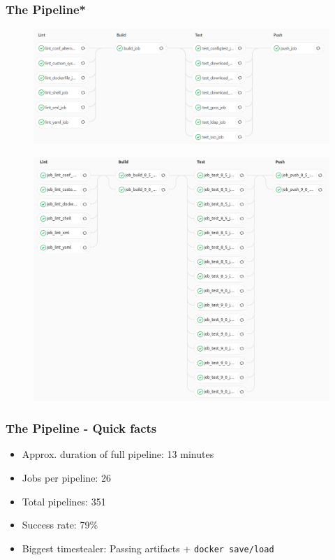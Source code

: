 \documentclass[14pt,aspectratio=169]{beamer}
\begin{document}
\begin{frame}
  \frametitle{The Pipeline*}
  \begin{figure}
    \includegraphics[width=\textwidth]{images/pipeline_2.png}
  \end{figure}
\end{frame}

\begin{frame}
  \begin{figure}
    \includegraphics[height=0.9\textheight]{images/pipeline_multi.png}
  \end{figure}
\end{frame}

\begin{frame}
  \frametitle{The Pipeline - Quick facts}
  \begin{itemize}
    \item Approx. duration of full pipeline: 13 minutes
    \item Jobs per pipeline: 26
    \item Total pipelines: 351
    \item Success rate: 79\%
    \item Biggest timestealer: Passing artifacts + \texttt{docker save/load}
  \end{itemize}
\end{frame}
\end{document}

